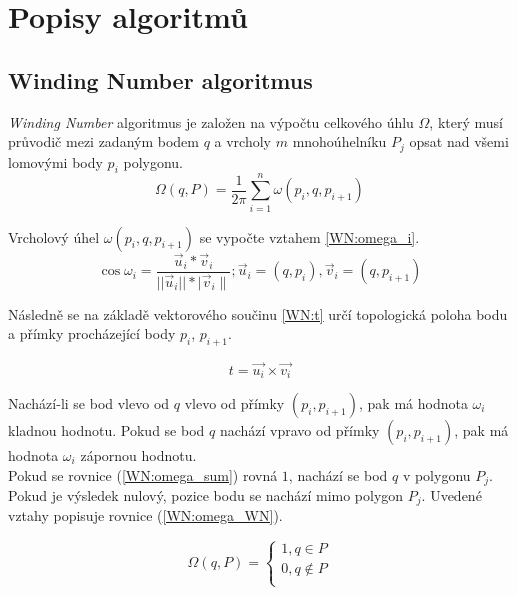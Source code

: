 \documentclass[11pt]{article}
\begin{document}

\section{Popisy algoritmů}
\subsection{Winding Number algoritmus}
\textit {Winding Number} algoritmus je založen na výpočtu celkového úhlu $\Omega$, který musí průvodič mezi zadaným bodem $q$ a vrcholy $m$ mnohoúhelníku ${P_{j}}$ opsat nad všemi lomovými body ${p_{i}}$ polygonu. 
\begin{equation}
\Omega(q, P)=\frac{1}{2 \pi} \sum_{i=1}^{n} \omega\left(p_{i}, q, p_{i+1}\right)
\label{WN:omega_sum}
\end{equation}

Vrcholový úhel $\omega\left(p_{i}, q, p_{i+1}\right)$ se vypočte vztahem \ref{WN:omega_i}. 
\begin{equation}
\cos \omega_{i}=\frac{\vec{u}_{i} * \vec{v}_{i}}{|| \vec{u}_{i}|| * \mid \vec{v}_{i} \|} ; \vec{u}_{i}=\left(q, p_{i}\right), \vec{v}_{i}=\left(q, p_{i+1}\right)
\label{WN:omega_i}
\end{equation}

Následně se na základě vektorového součinu \ref{WN:t}
určí topologická poloha bodu a přímky procházející body $p_{i}$, $p_{i+1}$.

\begin{equation}
t=\vec{u_{i}}\times\vec{v_{i}}
\label{WN:t}
\end{equation}

Nachází-li se bod vlevo od $q$ vlevo od přímky $(p_{i}, p_{i+1})$, pak má hodnota $\omega_{i}$ kladnou hodnotu. Pokud se bod $q$ nachází vpravo od přímky $(p_{i}, p_{i+1})$, pak má hodnota $\omega_{i}$ zápornou hodnotu.\\

Pokud se rovnice (\ref{WN:omega_sum}) rovná $1$, nachází se bod $q$ v polygonu ${P_{j}}$. Pokud je výsledek nulový, pozice bodu se nachází mimo polygon ${P_{j}}$.  Uvedené vztahy popisuje rovnice (\ref{WN:omega_WN}).

\begin{equation}
\Omega(q, P)=\left\{\begin{array}{l}
1, q \in P \\
0, q \notin P \\
\end{array}\right.
\label{WN:omega_WN}
\end{equation}
\end{document}
